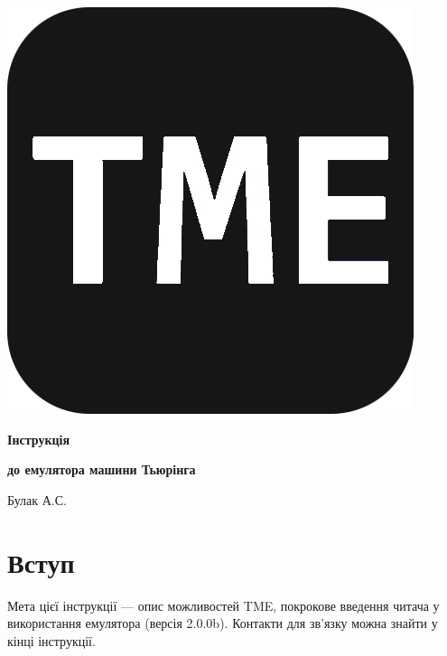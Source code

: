 \documentclass[oneside,final,14pt]{extreport}
\begin{document}
\begin{centering}

\thispagestyle{empty} %
\begin{minipage}[t]{16.75cm}

\begin{center}
\includegraphics[scale=0.1]{0}
\end{center}

\vspace{9cm}

\centerline{\Huge  \bfseries Інструкція}
\centerline{\Large \bfseries до емулятора машини Тьюрінга}

\vspace{11,9cm}

\centerline{Булак А.С.}
\vspace{0,2cm}


\end{minipage}

\end{centering}


\pagebreak
	
\tableofcontents
\pagebreak
\setcounter{page}{2}
	
\chapter*{Вступ}
Мета цієї інструкції --- опис можливостей TME, покрокове введення читача у використання емулятора (версія 2.0.0b). Контакти для зв'язку можна знайти у кінці інструкції.
\end{document}
